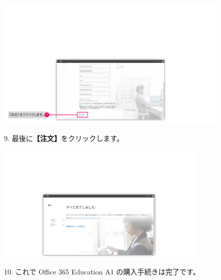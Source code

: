 \begin{figure}[h]
    \begin{minipage}{0.6\textwidth}
        \vspace{-2cm}\hspace{-0.8cm}
        \includegraphics[width=11.5cm]{figures/O365A1_buy04.png}
    \end{minipage}
    \begin{minipage}{0.4\textwidth}
        9. 最後に\textbf{【注文】}をクリックします。
    \end{minipage}
\end{figure}

\begin{figure}[h]
    \begin{minipage}{0.6\textwidth}
        \vspace{-2cm}
        \includegraphics[width=10cm]{figures/O365A1_buy05.png}
    \end{minipage}
    \begin{minipage}{0.4\textwidth}
        10. これで Office 365 Education A1 の購入手続きは完了です。
    \end{minipage}
    \vspace{13cm}
\end{figure}

